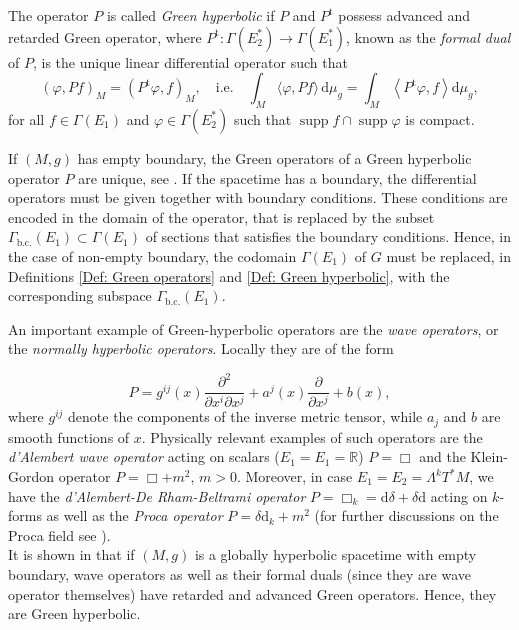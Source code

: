\begin{Definition}\label{Def: Green hyperbolic}
	The operator $P$ is called \emph{Green hyperbolic} if $P$ and $P^\mathrm{t}$ possess advanced and retarded Green operator, where $P^\mathrm{t}:\Gamma(E_2^\ast)\to \Gamma(E^\ast_1)$, known as the \emph{formal dual} of $P$, is the unique linear differential operator such that
	\begin{equation}
	(\varphi,Pf)_M=(P^\mathrm{t}\varphi,f)_M,\quad\text{i.e.}\quad
	\int_{M}\langle\varphi, P f\rangle\, \mathrm{d}\mu_g=\int_{M}\left\langle P^\mathrm{t} \varphi, f\right\rangle \mathrm{d} \mu_g,
	\end{equation}
	for all $f\in \Gamma(E_1)$ and $\varphi\in \Gamma(E^\ast_2)$ such that $\operatorname{supp} f\cap\operatorname{supp}\varphi$ is compact.
\end{Definition}

\begin{remark}
	If $(M,g)$ has empty boundary, the Green operators of a Green hyperbolic operator $P$ are unique, see \cite[Cor. 3.12]{Baer-15}. If the spacetime has a boundary, the differential operators must be given together with boundary conditions. These conditions are encoded in the domain of the operator, that is replaced by the subset $\Gamma_\mathrm{b.c.}(E_1)\subset \Gamma(E_1)$ of sections that satisfies the boundary conditions. Hence, in the case of non-empty boundary, the codomain $\Gamma(E_1)$ of $G$ must be replaced, in Definitions \ref{Def: Green operators} and \ref{Def: Green hyperbolic}, with the corresponding subspace $\Gamma_\mathrm{b.c.}(E_1)$.
\end{remark}

\begin{Example}
	An important example of Green-hyperbolic operators are the \emph{wave operators}, or the \emph{normally hyperbolic operators}. Locally they are of
	the form
	
	\begin{equation}
	P=g^{ij}(x)\frac{\partial^2}{\partial x^i\partial x^j}+a^j(x)\frac{\partial}{\partial x^j}+b(x),
	\end{equation}
	where $g^{i j}$ denote the components of the inverse metric tensor, while $a_j$ and $b$ are smooth functions of $x$.
	Physically relevant examples of such operators are the \emph{d'Alembert wave operator} acting on scalars ($E_1=E_1=\mathbb{R}$) $P=\Box$ and the Klein-Gordon operator $P=\Box+m^2$, $m>0$. Moreover, in case $ E_1= E_2=\Lambda^kT^*M$, we have the \emph{d'Alembert-De Rham-Beltrami operator} $P=\Box_k=\mathrm{d} \delta+\delta\mathrm{d}$ acting on $k$-forms as well as the \emph{Proca operator} $P=\delta\mathrm{d}_k+m^2$ (for further discussions on the Proca field see \cite{Fewster-Pfenning-03}).\\
	It is shown in \cite[Cor. 3.4.3]{Baer-Ginoux-Pfaffle-07} that if $(M,g)$ is a globally hyperbolic spacetime with empty boundary, wave operators as well as their formal duals (since they are wave operator themselves) have retarded and advanced Green operators. Hence, they are Green hyperbolic.
\end{Example}

